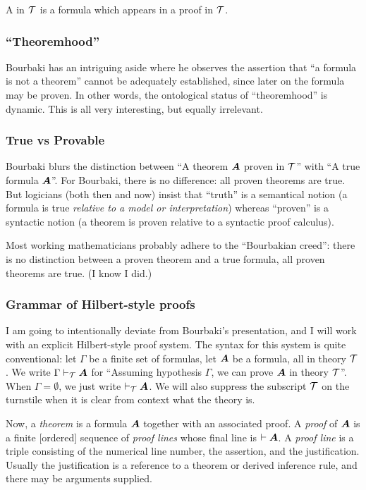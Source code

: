 \begin{definition}
A  in $\mathcal{T}$ is a formula which appears in a proof
in $\mathcal{T}$.
\end{definition}

\subsubsection{``Theoremhood''}
Bourbaki has an intriguing aside where he observes the assertion that ``a
formula is not a theorem'' cannot be adequately established, since later
on the formula may be proven. In other words, the ontological status of
``theoremhood'' is dynamic. This is all very interesting, but equally
irrelevant.

\subsubsection{True vs Provable}
Bourbaki blurs the distinction between ``A theorem $\boldsymbol{A}$ proven in
$\mathcal{T}$'' with ``A true formula $\boldsymbol{A}$''. For Bourbaki,
there is no difference: all proven theorems are true. But logicians
(both then and now) insist that ``truth'' is a semantical notion (a
formula is true \emph{relative to a model or interpretation}) whereas
``proven'' is a syntactic notion (a theorem is proven relative to a
syntactic proof calculus).

Most working mathematicians probably adhere to the ``Bourbakian creed'':
there is no distinction between a proven theorem and a true formula, all
proven theorems are true. (I know I did.)

\subsubsection{Grammar of Hilbert-style proofs}
I am going to intentionally deviate from Bourbaki's presentation, and I
will work with an explicit Hilbert-style proof system. The syntax for
this system is quite conventional: let $\Gamma$ be a finite set of
formulas, let $\boldsymbol{A}$ be a formula, all in theory
$\mathcal{T}$. We write $\Gamma\vdash_{\mathcal{T}}\boldsymbol{A}$ for
``Assuming hypothesis $\Gamma$, we can prove $\boldsymbol{A}$ in
theory $\mathcal{T}$''. When $\Gamma=\emptyset$, we just write
$\vdash_{\mathcal{T}}\boldsymbol{A}$. We will also suppress the
subscript $\mathcal{T}$ on the turnstile when it is clear from context
what the theory is.

Now, a \emph{theorem} is a formula $\boldsymbol{A}$ together with an
associated proof. A \emph{proof} of $\boldsymbol{A}$ is a finite
[ordered] sequence of \emph{proof lines} whose final line is
$\vdash\boldsymbol{A}$. A \emph{proof line} is a triple consisting of
the numerical line number, the assertion, and the justification. Usually
the justification is a reference to a theorem or derived inference rule,
and there may be arguments supplied.

